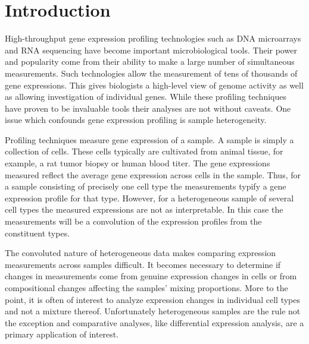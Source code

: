 \documentclass[reqno,12pt,oneside]{report}\usepackage[]{graphicx}\usepackage[]{color}
\theoremstyle{plain}
\theoremstyle{definition}
\theoremstyle{remark}
\numberwithin{theorem}{chapter}     %
\begin{document}
\startthechapters 

 \chapter{Introduction}
 \label{chap:Intro}

High-throughput gene expression profiling technologies such as DNA microarrays and RNA sequencing have become important microbiological tools. Their power and popularity come from their ability to make a large number of simultaneous measurements. Such technologies allow the measurement of tens of thousands of gene expressions. This gives biologists a high-level view of genome activity as well as allowing investigation of individual genes. While these profiling techniques have proven to be invaluable tools their analyses are not without caveats. One issue which confounds gene expression profiling is sample heterogeneity. 

Profiling techniques measure gene expression of a sample. A sample is simply a collection of cells. These cells typically are cultivated from animal tissue, for example, a rat tumor biopsy or human blood titer. The gene expressions measured reflect the average gene expression across cells in the sample. Thus, for a sample consisting of precisely one cell type the measurements typify a gene expression profile for that type. However, for a heterogeneous sample of several cell types the measured expressions are not as interpretable. In this case the measurements will be a convolution of the expression profiles from the constituent types. 

The convoluted nature of heterogeneous data makes comparing expression measurements across samples difficult. It becomes necessary to determine if changes in measurements come from genuine expression changes in cells or from compositional changes affecting the samples' mixing proportions. More to the point, it is often of interest to analyze expression changes in individual cell types and not a mixture thereof. Unfortunately heterogeneous samples are the rule not the exception and comparative analyses, like differential expression analysis, are a primary application of interest.
\end{document}
